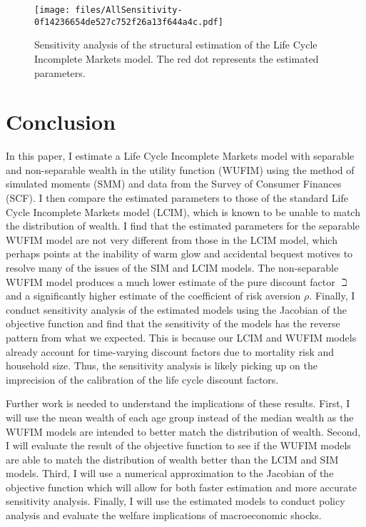\documentclass{article}
\newcommand{\CRRA}{\rho}
\begin{document}
\begin{figure}[!htbp]
\centering
\texttt{[image: files/AllSensitivity-0f14236654de527c752f26a13f644a4c.pdf]}
\caption{Sensitivity analysis of the structural estimation of the Life Cycle Incomplete Markets model. The red dot represents the estimated parameters.}
\label{fig:AllSensitivity}
\end{figure}

\section{Conclusion}\label{Conclusion}

In this paper, I estimate a Life Cycle Incomplete Markets model with separable and non-separable wealth in the utility function (WUFIM) using the method of simulated moments (SMM) and data from the Survey of Consumer Finances (SCF). I then compare the estimated parameters to those of the standard Life Cycle Incomplete Markets model (LCIM), which is known to be unable to match the distribution of wealth. I find that the estimated parameters for the separable WUFIM model are not very different from those in the LCIM model, which perhaps points at the inability of warm glow and accidental bequest motives to resolve many of the issues of the SIM and LCIM models. The non-separable WUFIM model produces a much lower estimate of the pure discount factor $\beth$ and a significantly higher estimate of the coefficient of risk aversion $\CRRA$. Finally, I conduct sensitivity analysis of the estimated models using the Jacobian of the objective function and find that the sensitivity of the models has the reverse pattern from what we expected. This is because our LCIM and WUFIM models already account for time-varying discount factors due to mortality risk and household size. Thus, the sensitivity analysis is likely picking up on the imprecision of the calibration of the life cycle discount factors.

Further work is needed to understand the implications of these results. First, I will use the mean wealth of each age group instead of the median wealth as the WUFIM models are intended to better match the distribution of wealth. Second, I will evaluate the result of the objective function to see if the WUFIM models are able to match the distribution of wealth better than the LCIM and SIM models. Third, I will use a numerical approximation to the Jacobian of the objective function which will allow for both faster estimation and more accurate sensitivity analysis. Finally, I will use the estimated models to conduct policy analysis and evaluate the welfare implications of macroeconomic shocks.





\end{document}
